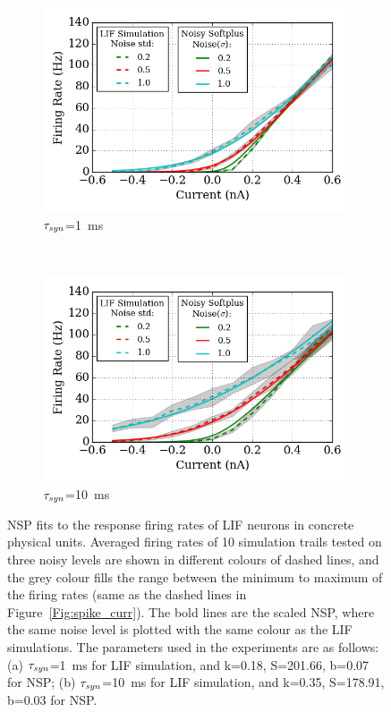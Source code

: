 	\begin{figure}
		\centering
		\begin{subfigure}[t]{0.7\textwidth}
			\includegraphics[width=\textwidth]{pics_iconip/revise_4-1.png}
			\caption{$\tau_{\textit{\textrm{syn}}}$=1~ms}
		\end{subfigure}\\
		\begin{subfigure}[t]{0.7\textwidth}
			\includegraphics[width=\textwidth]{pics_iconip/revise_4-2.png}
			\caption{$\tau_{\textit{\textrm{syn}}}$=10~ms}
		\end{subfigure}
		\caption[NSP fits to the response firing rates.]{NSP fits to the response firing rates of LIF neurons in concrete physical units. Averaged firing rates of 10 simulation trails tested on three noisy levels are shown in different colours of dashed lines, and the grey colour fills the range between the minimum to maximum of the firing rates (same as the dashed lines in Figure~\ref{Fig:spike_curr}). The bold lines are the scaled NSP, where the same noise level is plotted with the same colour as the LIF simulations. The parameters used in the experiments are as follows: (a) $\tau_{\textit{\textrm{syn}}}$=1~ms for LIF simulation, and k=0.18, S=201.66, b=0.07 for NSP; (b) $\tau_{\textit{\textrm{syn}}}$=10~ms for LIF simulation, and k=0.35, S=178.91, b=0.03 for NSP.}			\label{Fig:nsptau1}
	\end{figure}

